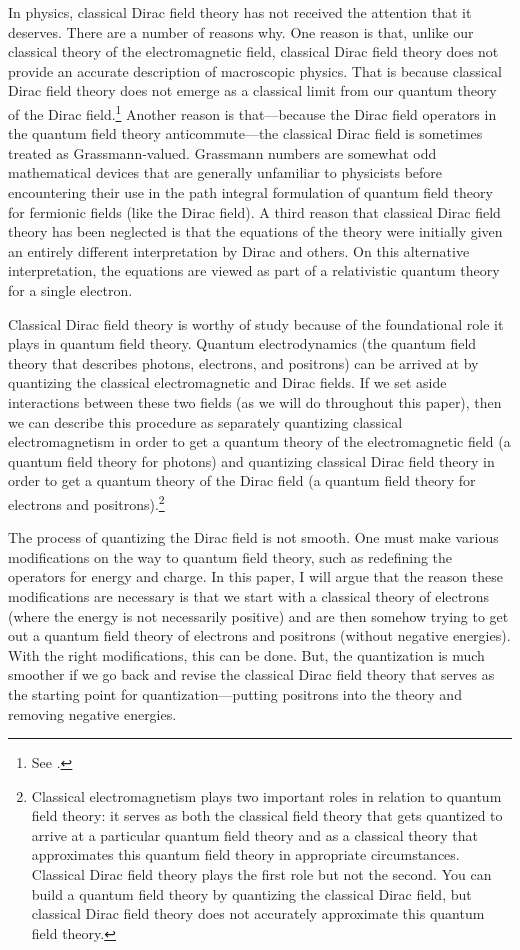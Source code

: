 \documentclass[onecolumn,secnumarabic,amsmath,amssymb,balancelastpage,nofootinbib]{article}
\begin{document}
In physics, classical Dirac field theory has not received the attention that it deserves.  There are a number of reasons why.  One reason is that, unlike our classical theory of the electromagnetic field, classical Dirac field theory does not provide an accurate description of macroscopic physics.  That is because classical Dirac field theory does not emerge as a classical limit from our quantum theory of the Dirac field.\footnote{See \citet[pg.\ 221]{duncan}.}  Another reason is that---because the Dirac field operators in the quantum field theory anticommute---the classical Dirac field is sometimes treated as Grassmann-valued.  Grassmann numbers are somewhat odd mathematical devices that are generally unfamiliar to physicists before encountering their use in the path integral formulation of quantum field theory for fermionic fields (like the Dirac field).  A third reason that classical Dirac field theory has been neglected is that the equations of the theory were initially given an entirely different interpretation by Dirac and others.  On this alternative interpretation, the equations are viewed as part of a relativistic quantum theory for a single electron.

Classical Dirac field theory is worthy of study because of the foundational role it plays in quantum field theory.  Quantum electrodynamics (the quantum field theory that describes photons, electrons, and positrons) can be arrived at by quantizing the classical electromagnetic and Dirac fields.  If we set aside interactions between these two fields (as we will do throughout this paper), then we can describe this procedure as separately quantizing classical electromagnetism in order to get a quantum theory of the electromagnetic field (a quantum field theory for photons) and quantizing classical Dirac field theory in order to get a quantum theory of the Dirac field (a quantum field theory for electrons and positrons).\footnote{Classical electromagnetism plays two important roles in relation to quantum field theory: it serves as both the classical field theory that gets quantized to arrive at a particular quantum field theory and as a classical theory that approximates this quantum field theory in appropriate circumstances.  Classical Dirac field theory plays the first role but not the second.  You can build a quantum field theory by quantizing the classical Dirac field, but classical Dirac field theory does not accurately approximate this quantum field theory.}

The process of quantizing the Dirac field is not smooth.  One must make various modifications on the way to quantum field theory, such as redefining the operators for energy and charge.  In this paper, I will argue that the reason these modifications are necessary is that we start with a classical theory of electrons (where the energy is not necessarily positive) and are then somehow trying to get out a quantum field theory of electrons and positrons (without negative energies).  With the right modifications, this can be done.  But, the quantization is much smoother if we go back and revise the classical Dirac field theory that serves as the starting point for quantization---putting positrons into the theory and removing negative energies.
\end{document}
